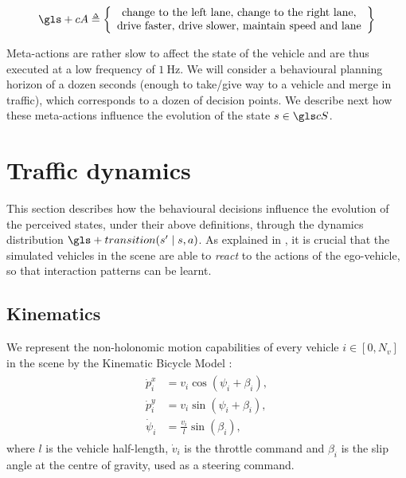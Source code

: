 \begin{equation}
\label{eq:action-space}
\gls+{cA} \eqdef \left\{ \begin{array}{c}
\text{change to the left lane},\, \text{change to the right lane}, \\
\text{drive faster},\, \text{drive slower},\, \text{maintain speed and lane}
\end{array}\right\}
\end{equation}

Meta-actions are rather slow to affect the state of the vehicle and are thus executed at a low frequency of $\SI{1}{\hertz}$. We will consider a behavioural planning horizon of a dozen seconds (enough to \eg take/give way to a vehicle and merge in traffic), which corresponds to a dozen of decision points. We describe next how these meta-actions influence the evolution of the state $s\in\cS$.

\section{Traffic dynamics}

This section describes how the behavioural decisions influence the evolution of the perceived states, under their above definitions, through the dynamics distribution $\gls+{transition}\parentheses{s' \mid s,a}$. As explained in , it is crucial that the simulated vehicles in the scene are able to \emph{react} to the actions of the ego-vehicle, so that interaction patterns can be learnt.

\subsection{Kinematics}

We represent the non-holonomic motion capabilities of every vehicle $i\in[0, N_v]$ in the scene by the Kinematic Bicycle Model \citep[see \eg][]{Polack2017}:
\begin{align}
\begin{split}
\dot{p}^x_i &= v_i\cos(\psi_i + \beta_i), \\
\dot{p}^y_i &= v_i\sin(\psi_i + \beta_i),\\
\dot{\psi}_i &= \frac{v_i}{l}\sin(\beta_i),
\end{split}
\end{align}
where $l$ is the vehicle half-length, $\dot{v}_i$ is the throttle command and $\beta_i$ is the slip angle at the centre of gravity, used as a steering command.

